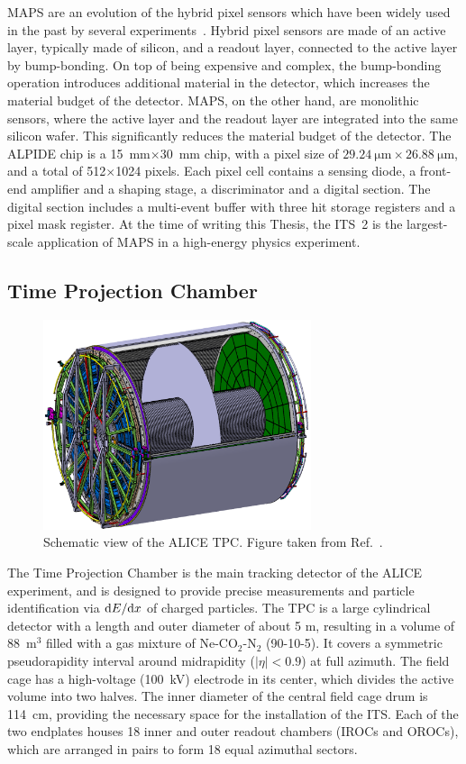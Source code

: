 MAPS are an evolution of the hybrid pixel sensors which have been widely used in the past by several experiments~\cite{ALICE:2008ngc,CMS:1997tlf,Aad:2008zz,Bediaga:2013tje}. Hybrid pixel sensors are made of an active layer, typically made of silicon, and a readout layer, connected to the active layer by bump-bonding. On top of being expensive and complex, the bump-bonding operation introduces additional material in the detector, which increases the material budget of the detector. MAPS, on the other hand, are monolithic sensors, where the active layer and the readout layer are integrated into the same silicon wafer. This significantly reduces the material budget of the detector. The ALPIDE chip is a 15~mm$\times$30~mm chip, with a pixel size of $\SI{29.24}{\micro\meter}\times\SI{26.88}{\micro\meter}$, and a total of 512$\times$1024 pixels. Each pixel cell contains a sensing diode, a front-end amplifier and a shaping stage, a discriminator and a digital section. The digital section includes a multi-event buffer with three hit storage registers and a pixel mask register. At the time of writing this Thesis, the ITS~2 is the largest-scale application of MAPS in a high-energy physics experiment.

\subsection{Time Projection Chamber}
\begin{figure}
    \centering
    \includegraphics[width=0.7\textwidth]{Figures/Chapter 3/TPC_Scheme.png}
    \caption{Schematic view of the ALICE TPC. Figure taken from Ref.~\cite{ALICE:2023udb}.}
    \label{fig:TPC}
\end{figure}
The Time Projection Chamber is the main tracking detector of the ALICE experiment, and is designed to provide precise \pt measurements and particle identification via $\mathrm{d} E/\mathrm{d} x$ of charged particles. The TPC is a large cylindrical detector with a length and outer diameter of about 5 m, resulting in a volume of 88~m$^3$ filled with a gas mixture of Ne-CO$_2$-N$_2$ (90-10-5). It covers a symmetric pseudorapidity interval around midrapidity ($\lvert\eta\rvert < 0.9$) at full azimuth. The field cage has a high-voltage (100~kV) electrode in its center, which divides the active volume into two halves. The inner diameter of the central field cage drum is 114~cm, providing the necessary space for the installation of the ITS.  Each of the two endplates houses 18 inner and outer readout chambers (IROCs and OROCs), which are arranged in pairs to form 18 equal azimuthal sectors.

